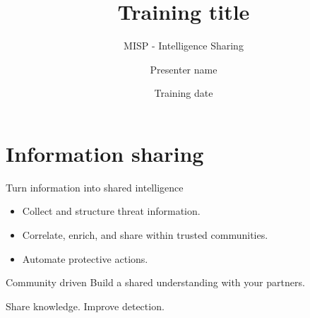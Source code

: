 \documentclass{beamer}
\title{Training title}
\subtitle{MISP - Intelligence Sharing}
\author{Presenter name}
\institute{MISP Project \\ \url{https://www.misp-project.org/}}
\date{Training date}
\begin{document}
\begin{frame}[t,plain]
    \titlepage
\end{frame}

\section{Information sharing}
\begin{frame}{Turn information into shared intelligence}
    \begin{itemize}
        \item Collect and structure threat information.
        \item Correlate, enrich, and share within trusted communities.
        \item Automate protective actions.
    \end{itemize}
    \begin{block}{Community driven}
        Build a shared understanding with your partners.
    \end{block}
\end{frame}

\begin{frame}[focus]
    Share knowledge. Improve detection.
\end{frame}
\end{document}

